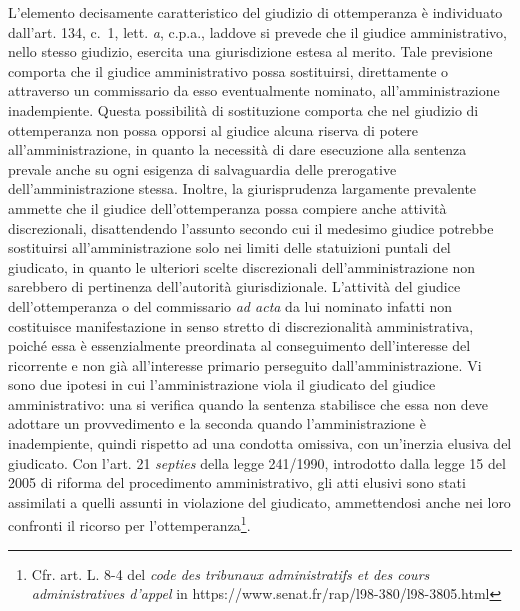 \documentclass[12pt,it,a4paper,]{report}
\begin{document}
L'elemento decisamente caratteristico del giudizio di ottemperanza è
individuato dall'art. 134, c.~1, lett. \emph{a}, c.p.a., laddove si
prevede che il giudice amministrativo, nello stesso giudizio, esercita
una giurisdizione estesa al merito. Tale previsione comporta che il
giudice amministrativo possa sostituirsi, direttamente o attraverso un
commissario da esso eventualmente nominato, all'amministrazione
inadempiente. Questa possibilità di sostituzione comporta che nel
giudizio di ottemperanza non possa opporsi al giudice alcuna riserva di
potere all'amministrazione, in quanto la necessità di dare esecuzione
alla sentenza prevale anche su ogni esigenza di salvaguardia delle
prerogative dell'amministrazione stessa. Inoltre, la giurisprudenza
largamente prevalente ammette che il giudice dell'ottemperanza possa
compiere anche attività discrezionali, disattendendo l'assunto secondo
cui il medesimo giudice potrebbe sostituirsi all'amministrazione solo
nei limiti delle statuizioni puntali del giudicato, in quanto le
ulteriori scelte discrezionali dell'amministrazione non sarebbero di
pertinenza dell'autorità giurisdizionale. L'attività del giudice
dell'ottemperanza o del commissario \emph{ad acta} da lui nominato
infatti non costituisce manifestazione in senso stretto di
discrezionalità amministrativa, poiché essa è essenzialmente preordinata
al conseguimento dell'interesse del ricorrente e non già all'interesse
primario perseguito dall'amministrazione. Vi sono due ipotesi in cui
l'amministrazione viola il giudicato del giudice amministrativo: una si
verifica quando la sentenza stabilisce che essa non deve adottare un
provvedimento e la seconda quando l'amministrazione è inadempiente,
quindi rispetto ad una condotta omissiva, con un'inerzia elusiva del
giudicato. Con l'art. 21 \emph{septies} della legge 241/1990, introdotto
dalla legge 15 del 2005 di riforma del procedimento amministrativo, gli
atti elusivi sono stati assimilati a quelli assunti in violazione del
giudicato, ammettendosi anche nei loro confronti il ricorso per
l'ottemperanza\footnote{Cfr. art. L. 8-4 del \emph{code des tribunaux
  administratifs et des cours administratives d'appel} in
  https://www.senat.fr/rap/l98-380/l98-3805.html}.
\end{document}
